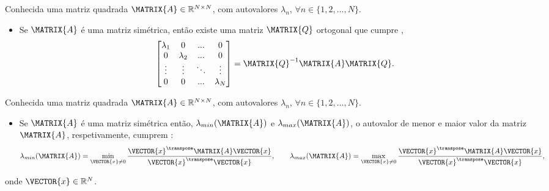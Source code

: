 \begin{theorem}\label{theo:simetricmatrix2}
Conhecida uma matriz quadrada $\MATRIX{A} \in \mathbb{R}^{N \times N}$, 
com  autovalores $\lambda_n$, $\forall n \in \{1, 2, ..., N\}$.
\begin{itemize}
\item Se $\MATRIX{A}$ é uma matriz simétrica, então
existe uma matriz $\MATRIX{Q}$ ortogonal que cumpre \cite[pp. 67,440]{golub2013matrix},
\begin{equation}
\begin{bmatrix}
\lambda_1 & 0         & ...    & 0 \\
0         & \lambda_2 & ...    & 0 \\
\vdots    & \vdots    & \ddots & \vdots \\
0         & 0         & ...    & \lambda_N
\end{bmatrix}
=\MATRIX{Q}^{-1}\MATRIX{A}\MATRIX{Q}.
\end{equation}
\end{itemize}
\end{theorem}

\begin{theorem}\label{theo:simetricmatrix3}
Conhecida uma matriz quadrada $\MATRIX{A} \in \mathbb{R}^{N \times N}$, 
com  autovalores $\lambda_n$, $\forall n \in \{1, 2, ..., N\}$.
\begin{itemize}
\item Se $\MATRIX{A}$ é uma matriz simétrica então, $\lambda_{min}(\MATRIX{A})$ e $\lambda_{max}(\MATRIX{A})$,
o autovalor de menor e maior valor da  matriz $\MATRIX{A}$, respetivamente, cumprem \cite[pp. 67]{golub2013matrix}:
\begin{equation}
\lambda_{min}(\MATRIX{A}) = \min_{\VECTOR{x}\neq 0} \frac{\VECTOR{x}^{\transpose}\MATRIX{A}\VECTOR{x}}{\VECTOR{x}^{\transpose}\VECTOR{x}},
\qquad
\lambda_{max}(\MATRIX{A}) = \max_{\VECTOR{x}\neq 0} \frac{\VECTOR{x}^{\transpose}\MATRIX{A}\VECTOR{x}}{\VECTOR{x}^{\transpose}\VECTOR{x}},
\end{equation}
\end{itemize}
onde $\VECTOR{x} \in \mathbb{R}^N$.
\end{theorem}

